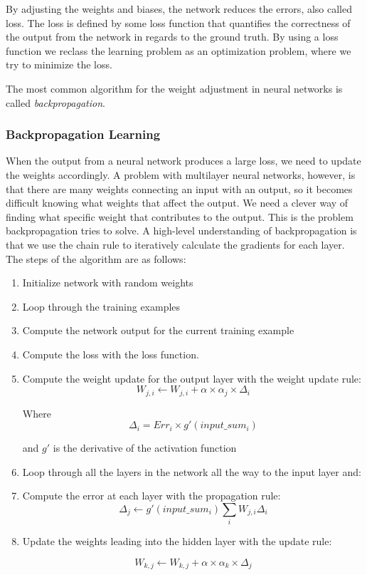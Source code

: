 By adjusting the weights and biases, the network reduces the errors, also called loss. The loss is defined by some loss function that quantifies the correctness of the output from the network in regards to the ground truth. By using a loss function we reclass the learning problem as an optimization problem, where we try to minimize the loss.

The most common algorithm for the weight adjustment in neural networks is called \emph{backpropagation}.


\subsubsection*{Backpropagation Learning}
When the output from a neural network produces a large loss, we need to update the weights accordingly. A problem with multilayer neural networks, however, is that there are many weights connecting an input with an output, so it becomes difficult knowing what weights that affect the output. We need a clever way of finding what specific weight that contributes to the output. This is the problem backpropagation tries to solve. A high-level understanding of backpropagation is that we use the chain rule to iteratively calculate the gradients for each layer. The steps of the algorithm are as follows:

\begin{enumerate}
    \item Initialize network with random weights
    \item Loop through the training examples
    \item Compute the network output for the current training example
    \item Compute the loss with the loss function.
    \item Compute the weight update for the output layer with the weight update rule:
    $$
        W_{j,i} \leftarrow W_{j,i} + \alpha \times \alpha_j \times \Delta_i
    $$
    
    Where 
    $$
        \Delta_i = Err_i \times g'(input\_sum_i)
    $$
    
    and $g'$ is the derivative of the activation function
    
    \item Loop through all the layers in the network all the way to the input layer and:
    \item Compute the error at each layer with the propagation rule:
    $$ 
        \Delta_j \leftarrow g'(input\_sum_i)\sum_{i}W_{j,i}\Delta_i
    $$
    
    \item Update the weights leading into the hidden layer with the update rule:
    
    $$ 
        W_{k,j} \leftarrow W_{k,j} + \alpha \times \alpha_k \times \Delta_j
    $$
    
\end{enumerate}

